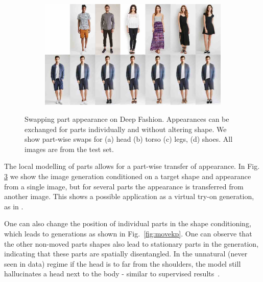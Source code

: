 \begin{figure}[htp]
\begin{subfigure}{0.49\linewidth}
		\label{fig:part3_21}
		\end{subfigure}
		\begin{subfigure}{0.49\linewidth}
		\centering
		\includegraphics[trim={0cm 0cm 0cm 0cm},clip, width=1.\linewidth]{fig/factor/part6_30}\caption{}
		\label{fig:part3_30}
		\end{subfigure}
		\caption{Swapping part appearance on Deep Fashion. Appearances can be exchanged for parts individually and without altering shape. We show part-wise swaps for (a) head (b) torso (c) legs, (d) shoes. All images are from the test set.}
		\label{fig:partswaps}
	\end{figure}

	The local modelling of parts allows for a part-wise transfer of appearance. In Fig. \ref{fig:partswaps} we show the image generation conditioned on a target shape and appearance from a single image, but for several parts the appearance is transferred from another image. This shows a possible application as a virtual try-on generation, as in \cite{han17viton}.

	One can also change the position of individual parts in the shape conditioning, which leads to generations as shown in Fig.~\ref{fig:movekp}. One can observe that the other non-moved parts shapes also lead to stationary parts in the generation, indicating that these parts are spatially disentangled. In the unnatural (never seen in data) regime \eg if the head is to far from the shoulders, the model still hallucinates a head next to the body - similar to supervised results~\cite{debem18dgpose}.

